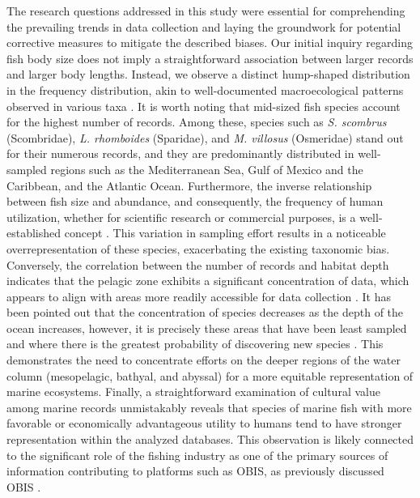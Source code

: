 \documentclass[12pt,authoryear]{elsarticle}
\begin{document}
The research questions addressed in this study were essential for comprehending the prevailing trends in data collection and laying the groundwork for potential corrective measures to mitigate the described biases. Our initial inquiry regarding fish body size does not imply a straightforward association between larger records and larger body lengths. Instead, we observe a distinct hump-shaped distribution in the frequency distribution, akin to well-documented macroecological patterns observed in various taxa \citep{smithFoundationsMacroecologyClassic2014, Allen_etAl_bodysize_Ecol_Letters_2006}. It is worth noting that mid-sized fish species account for the highest number of records. Among these, species such as \textit{S. scombrus} (Scombridae), \textit{L. rhomboides} (Sparidae), and \textit{M. villosus} (Osmeridae) stand out for their numerous records, and they are predominantly distributed in well-sampled regions such as the Mediterranean Sea, Gulf of Mexico and the Caribbean, and the Atlantic Ocean. Furthermore, the inverse relationship between fish size and abundance, and consequently, the frequency of human utilization, whether for scientific research or commercial purposes, is a well-established concept  \citep{pauly2005}. This variation in sampling effort results in a noticeable overrepresentation of these species, exacerbating the existing taxonomic bias. Conversely, the correlation between the number of records and habitat depth indicates that the pelagic zone exhibits a significant concentration of data, which appears to align with areas more readily accessible for data collection  \citep{melo2020}. It has been pointed out that the concentration of species decreases as the depth of the ocean increases, however, it is precisely these areas that have been least sampled and where there is the greatest probability of discovering new species \citep{costello2017marine}. This demonstrates the need to concentrate efforts on the deeper regions of the water column (mesopelagic, bathyal, and abyssal) for a more equitable representation of marine ecosystems. Finally,  a straightforward examination of cultural value among marine records unmistakably reveals that species of marine fish with more favorable or economically advantageous utility to humans tend to have stronger representation within the analyzed databases. This observation is likely connected to the significant role of the fishing industry as one of the primary sources of information contributing to platforms such as OBIS, as previously discussed OBIS \citep{zhang2002}.
\end{document}
